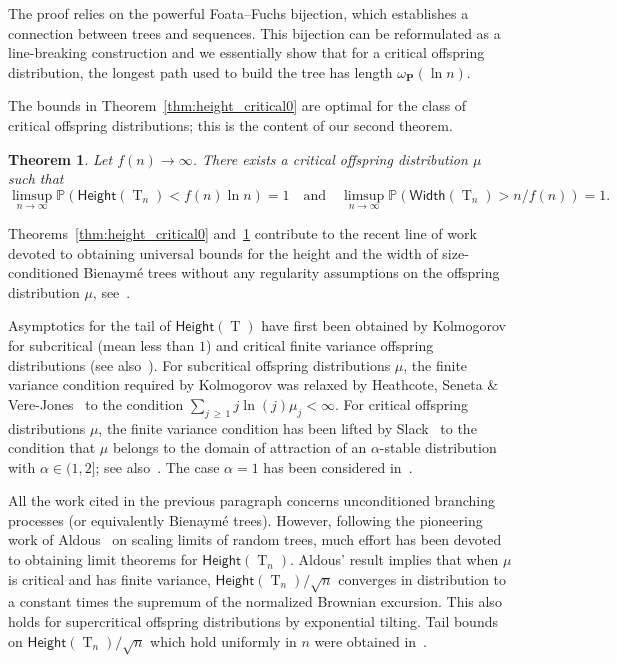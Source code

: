 \documentclass[10pt]{amsart}
\newtheorem{theo}{Theorem}[section]
\theoremstyle{definition}\newtheorem{defi}[theo]{Definition}\newtheorem{rema}[theo]{Remark}\newtheorem{exam}[theo]{Example}\newtheorem{exem}[theo]{Example}\newtheorem{nota}[theo]{Notation}
\renewcommand{\P}{\mathbb{P}}
\renewcommand{\H}{\mathsf{Height}}
\newcommand{\p}{\mathbf{P}}
\newcommand{\Width}{\mathsf{Width}}
\DeclareMathOperator{\rtree}{T}
\newcommand{\Tn}{\rtree_{n}}
\begin{document}
The proof relies on the powerful Foata--Fuchs bijection, which establishes a connection between trees and sequences. This bijection can be reformulated as a line-breaking construction and we essentially show that for a critical offspring distribution, the longest path used to build the tree has length $\omega_{\p}(\ln n)$.

The bounds in Theorem~\ref{thm:height_critical0} are optimal for the class of critical offspring distributions; this is the content of our second theorem.


\begin{theo}\label{thm:critical_short_trees0}
Let $f(n)\to \infty$. There exists a critical offspring distribution $\mu$ such that
\[
\limsup_{n\to \infty} \P\left(\H(\rtree_{n})<f(n)\ln n\right)=1
\quad \text{and} \quad
\limsup_{n\to \infty} \P\left(\Width(\rtree_{n})> n/f(n)\right)=1.
\]
\end{theo}


Theorems~\ref{thm:height_critical0} and~\ref{thm:critical_short_trees0} contribute to the recent line of work devoted to obtaining universal bounds for the height and the width of size-conditioned Bienaymé trees without any regularity assumptions on the offspring distribution $\mu$, see~\cite{Add19,ABHK21,AD22}.

Asymptotics for the tail of $\H(\rtree)$ have first been obtained by Kolmogorov \cite{Kol38} for subcritical (mean less than $1$) and critical finite variance offspring distributions (see also~\cite[Eq.~(9.5) and~(10.8)]{Har63}). For subcritical offspring distributions $\mu$, the finite variance condition required by Kolmogorov was relaxed by Heathcote, Seneta \& Vere-Jones~\cite{HSV67} to the condition $\sum_{j\,\geq\,1} j \ln(j) \mu_{j} < \infty$. For critical offspring distributions $\mu$, the finite variance condition has been lifted by Slack~\cite{Sla68} to the condition that $\mu$ belongs to the domain of attraction of an $\alpha$-stable distribution with $\alpha \in (1,2]$; see also~\cite{BS71}. The case $\alpha=1$ has been considered in~\cite{LS08,NW07,Sze76}.

All the work cited in the previous paragraph concerns unconditioned branching processes (or equivalently Bienaymé trees). However, following the pioneering work of Aldous~\cite{Ald93} on scaling limits of random trees, much effort has been devoted to obtaining limit theorems for $\H(\Tn)$. Aldous' result implies that when $\mu$ is critical and has finite variance, $\H(\Tn)/\sqrt{n}$ converges in distribution to a constant times the supremum of the normalized Brownian excursion. This also holds for supercritical offspring distributions by exponential tilting. Tail bounds on $\H(\Tn)/\sqrt{n}$ which hold uniformly in $n$ were obtained in~\cite{ADS13}.
\end{document}
